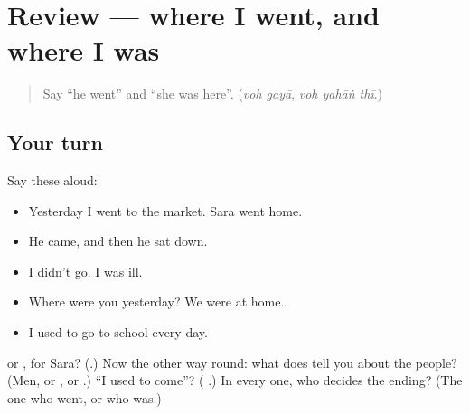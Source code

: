 \section[(review)]{Review — where I went, and where I was}

\label{lesson:UR-R264-where-i-went}



\begin{quote}
Say \textquotedblleft{}he went\textquotedblright{} and \textquotedblleft{}she was here\textquotedblright{}. (\emph{voh gayā}, \emph{voh yahāṅ thī}.)
\end{quote}

\subsection*{Your turn}
Say these aloud:

\begin{itemize}
\raggedright
  \item Yesterday I went to the market. Sara went home.
  \item He came, and then he sat down.
  \item I didn't go. I was ill.
  \item Where were you yesterday? We were at home.
  \item I used to go to school every day.
\end{itemize}

\begin{tcolorbox}[breakable,colback=teal!4,colframe=teal!35!black,title={Before you move on}]
\textbf{ } or \textbf{ }, for Sara? (\textbf{}.) Now the other way round: what does \textbf{} tell you about the people? (Men, or \textbf{}, or \textbf{}.) \textquotedblleft{}I used to come\textquotedblright{}? (\textbf{  }.) In every one, who decides the ending? (The one who went, or who was.)
\end{tcolorbox}
